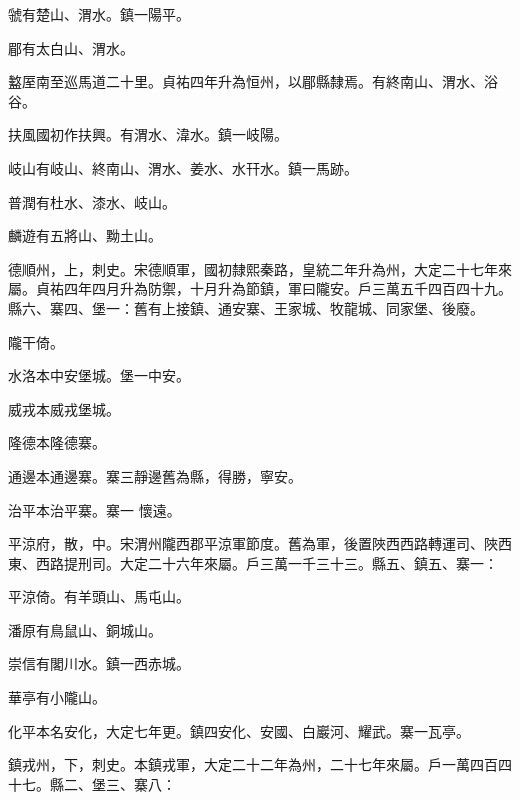 \begin{pinyinscope}
 虢有楚山、渭水。鎮一陽平。



 郿有太白山、渭水。



 盭厔南至巡馬道二十里。貞祐四年升為恒州，以郿縣隸焉。有終南山、渭水、浴谷。



 扶風國初作扶興。有渭水、湋水。鎮一岐陽。



 岐山有岐山、終南山、渭水、姜水、水幵水。鎮一馬跡。



 普潤有杜水、漆水、岐山。



 麟遊有五將山、黝土山。



 德順州，上，刺史。宋德順軍，國初隸熙秦路，皇統二年升為州，大定二十七年來屬。貞祐四年四月升為防禦，十月升為節鎮，軍曰隴安。戶三萬五千四百四十九。縣六、寨四、堡一：舊有上接鎮、通安寨、王家城、牧龍城、同家堡、後廢。



 隴干倚。



 水洛本中安堡城。堡一中安。



 威戎本威戎堡城。



 隆德本隆德寨。



 通邊本通邊寨。寨三靜邊舊為縣，得勝，寧安。



 治平本治平寨。寨一
 懷遠。



 平涼府，散，中。宋渭州隴西郡平涼軍節度。舊為軍，後置陜西西路轉運司、陜西東、西路提刑司。大定二十六年來屬。戶三萬一千三十三。縣五、鎮五、寨一：



 平涼倚。有羊頭山、馬屯山。



 潘原有鳥鼠山、銅城山。



 崇信有閣川水。鎮一西赤城。



 華亭有小隴山。



 化平本名安化，大定七年更。鎮四安化、安國、白巖河、耀武。寨一瓦亭。



 鎮戎州，下，刺史。本鎮戎軍，大定二十二年為州，二十七年來屬。戶一萬四百四十七。縣二、堡三、寨八：




\end{pinyinscope}
